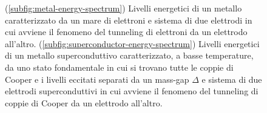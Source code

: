 \begin{figure}[!ht]
	 \qquad
	\caption{(\ref{subfig:metal-energy-spectrum}) Livelli energetici di un metallo caratterizzato da un mare di elettroni e sistema di due elettrodi in cui avviene il fenomeno del tunneling di elettroni da un elettrodo all'altro. (\ref{subfig:superconductor-energy-spectrum}) Livelli energetici di un metallo superconduttivo caratterizzato, a basse temperature, da uno stato fondamentale in cui si trovano tutte le coppie di Cooper e i livelli eccitati separati da un mass-gap $\Delta$ e sistema di due elettrodi superconduttivi in cui avviene il fenomeno del tunneling di coppie di Cooper da un elettrodo all'altro.}
\end{figure}


